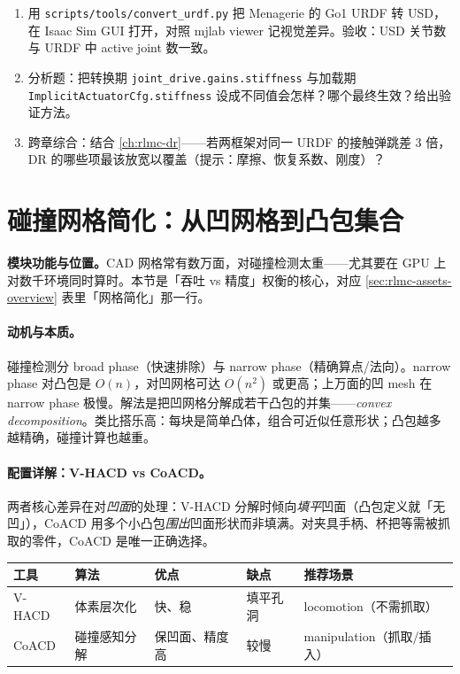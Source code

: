 \begin{practice}[动手：v2.x 转换与对照]
\begin{enumerate}
  \item 用 \texttt{scripts/tools/convert\_urdf.py} 把 Menagerie 的 Go1 URDF 转 USD，在 Isaac Sim GUI 打开，对照 mjlab viewer 记视觉差异。验收：USD 关节数与 URDF 中 active joint 数一致。
  \item 分析题：把转换期 \texttt{joint\_drive.gains.stiffness} 与加载期 \texttt{ImplicitActuatorCfg.stiffness} 设成不同值会怎样？哪个最终生效？给出验证方法。
  \item 跨章综合：结合 \cref{ch:rlmc-dr}——若两框架对同一 URDF 的接触弹跳差 3 倍，DR 的哪些项最该放宽以覆盖（提示：摩擦、恢复系数、刚度）？
\end{enumerate}
\end{practice}

\section{碰撞网格简化：从凹网格到凸包集合}
\label{sec:rlmc-assets-collision}

\textbf{模块功能与位置。}CAD 网格常有数万面，对碰撞检测太重——尤其要在 GPU 上对数千环境同时算时。本节是「吞吐 vs 精度」权衡的核心，对应 \cref{sec:rlmc-assets-overview} 表里「网格简化」那一行。

\paragraph{动机与本质。}碰撞检测分 broad phase（快速排除）与 narrow phase（精确算点/法向）。narrow phase 对凸包是 $O(n)$，对凹网格可达 $O(n^2)$ 或更高；上万面的凹 mesh 在 narrow phase 极慢。解法是把凹网格分解成若干凸包的并集——\emph{convex decomposition}。类比搭乐高：每块是简单凸体，组合可近似任意形状；凸包越多越精确，碰撞计算也越重。

\paragraph{配置详解：V-HACD vs CoACD。}两者核心差异在对\emph{凹面}的处理：V-HACD 分解时倾向\emph{填平}凹面（凸包定义就「无凹」），CoACD 用多个小凸包\emph{围出}凹面形状而非填满。对夹具手柄、杯把等需被抓取的零件，CoACD 是唯一正确选择。

\begin{center}
\small
\begin{tabular}{@{}lllll@{}}
\toprule
工具 & 算法 & 优点 & 缺点 & 推荐场景 \\
\midrule
V-HACD & 体素层次化 & 快、稳 & 填平孔洞 & locomotion（不需抓取） \\
CoACD & 碰撞感知分解 & 保凹面、精度高 & 较慢 & manipulation（抓取/插入） \\
\bottomrule
\end{tabular}
\end{center}

